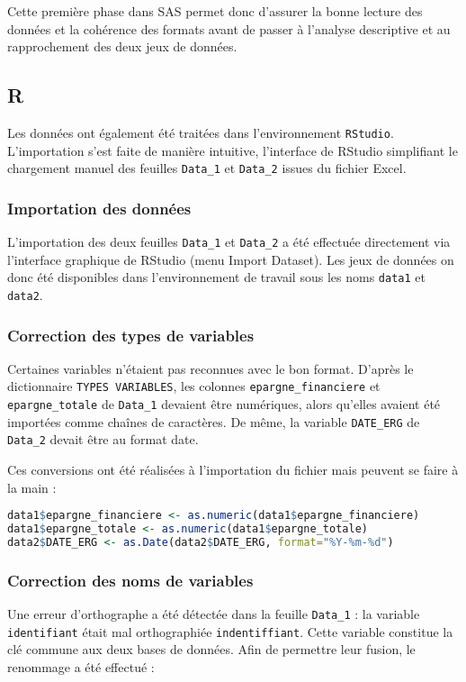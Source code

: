 Cette première phase dans SAS permet donc d'assurer la bonne lecture des données et la cohérence des formats avant de passer à l'analyse descriptive et au rapprochement des deux jeux de données.

\subsection{R}

Les données ont également été traitées dans l'environnement \texttt{RStudio}.  
L'importation s'est faite de manière intuitive, l'interface de RStudio simplifiant le chargement manuel des feuilles \texttt{Data\_1} et \texttt{Data\_2} issues du fichier Excel.  

\subsubsection{Importation des données}
L'importation des deux feuilles \texttt{Data\_1} et \texttt{Data\_2} a été effectuée directement via l'interface graphique de RStudio (menu Import Dataset).  
Les jeux de données on donc été disponibles dans l'environnement de travail sous les noms \texttt{data1} et \texttt{data2}.  

\subsubsection{Correction des types de variables}
Certaines variables n'étaient pas reconnues avec le bon format.  
D'après le dictionnaire \texttt{TYPES VARIABLES}, les colonnes \texttt{epargne\_financiere} et \texttt{epargne\_totale} de \texttt{Data\_1} devaient être numériques, alors qu'elles avaient été importées comme chaînes de caractères.  
De même, la variable \texttt{DATE\_ERG} de \texttt{Data\_2} devait être au format date.  

Ces conversions ont été réalisées à l'importation du fichier mais peuvent se faire à la main :

\begin{lstlisting}[language=R, caption=Conversion des variables]
data1$epargne_financiere <- as.numeric(data1$epargne_financiere)
data1$epargne_totale <- as.numeric(data1$epargne_totale)
data2$DATE_ERG <- as.Date(data2$DATE_ERG, format="%Y-%m-%d")
\end{lstlisting}

\subsubsection{Correction des noms de variables}
Une erreur d'orthographe a été détectée dans la feuille \texttt{Data\_1} : la variable \texttt{identifiant} était mal orthographiée \texttt{indentiffiant}.  
Cette variable constitue la clé commune aux deux bases de données.  
Afin de permettre leur fusion, le renommage a été effectué :  

